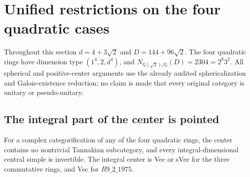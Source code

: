 \section{Unified restrictions on the four quadratic cases}
\label{sec:quadratic-frontier-retry}
Throughout this section $d=4+3\sqrt2$ and $D=144+96\sqrt2$.
The four quadratic rings have dimension type $(1^4,2,d^4)$, and
$N_{\mathbb Q(\sqrt2)/\mathbb Q}(D)=2304=2^8 3^2$.
All spherical and positive-center arguments use the already audited
sphericalization and Galois-existence reduction; no claim is made that
every original category is unitary or pseudo-unitary.

\subsection{The integral part of the center is pointed}
\begin{proposition}
For a complex categorification of any of the four quadratic rings,
the center contains no nontrivial Tannakian subcategory, and every
integral-dimensional central simple is invertible. The integral center
is Vec or sVec for the three commutative rings, and Vec for $R9\_2\_1975$.
\end{proposition}
